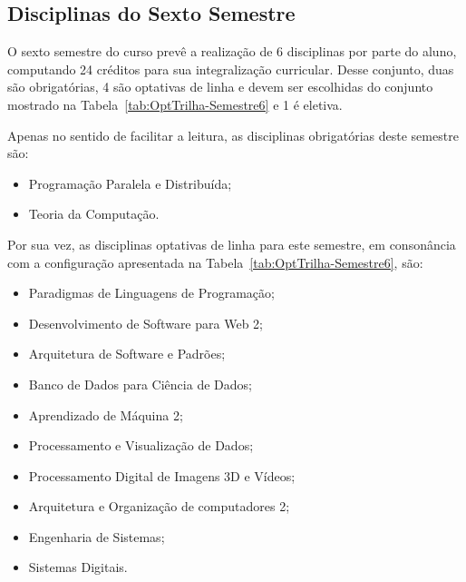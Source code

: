    
    
    
    
    
    
    
    
    
    
    
    
    
    \subsection{Disciplinas do Sexto Semestre}
    
    O sexto semestre do curso prevê a realização de 6 disciplinas por parte do aluno, computando 24 créditos para sua integralização curricular. Desse conjunto, duas são obrigatórias, 4 são optativas de linha e devem ser escolhidas do conjunto mostrado na Tabela~\ref{tab:OptTrilha-Semestre6} e 1 é eletiva. 
    
    Apenas no sentido de facilitar a leitura, as disciplinas obrigatórias deste semestre são: 
    
    \begin{itemize}
        \item Programação Paralela e Distribuída;
        \item Teoria da Computação.
    \end{itemize}
    
    Por sua vez, as disciplinas optativas de linha para este semestre, em consonância com a configuração apresentada na Tabela~\ref{tab:OptTrilha-Semestre6}, são:
    
    \begin{itemize}
        \item Paradigmas de Linguagens de Programação;
        \item Desenvolvimento de Software para Web 2;
        \item Arquitetura de Software e Padrões;
        \item Banco de Dados para Ciência de Dados;
        \item Aprendizado de Máquina 2;
        \item Processamento e Visualização de Dados;
        \item Processamento Digital de Imagens 3D e Vídeos;
        \item Arquitetura e Organização de computadores 2;
        \item Engenharia de Sistemas;
        \item Sistemas Digitais.
       
    \end{itemize}
    
